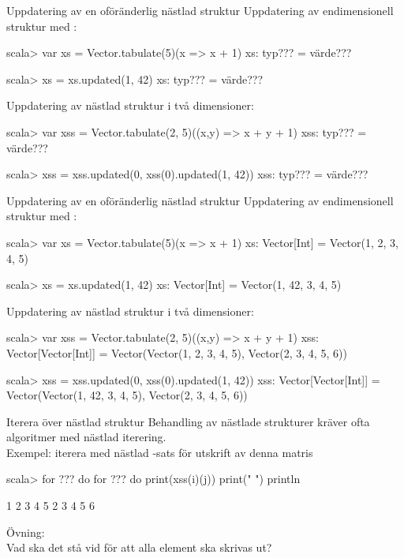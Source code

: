 \begin{Slide}{Uppdatering av en oföränderlig nästlad struktur}\SlideFontSmall
Uppdatering av endimensionell struktur med :\\
{\SlideFontTiny{} }
\begin{REPL}
scala> var xs = Vector.tabulate(5)(x => x + 1)
xs: typ??? = värde???

scala> xs = xs.updated(1, 42)
xs: typ??? = värde???
\end{REPL}

Uppdatering av nästlad struktur i två dimensioner:
\begin{REPL}
scala> var xss = Vector.tabulate(2, 5)((x,y) => x + y + 1)
xss:
  typ??? =
  värde???

scala> xss = xss.updated(0, xss(0).updated(1, 42))
xss:
  typ??? =
  värde???
\end{REPL}

\end{Slide}



\begin{Slide}{Uppdatering av en oföränderlig nästlad struktur}\SlideFontSmall
Uppdatering av endimensionell struktur med :\\
{\SlideFontTiny{} }
\begin{REPL}
scala> var xs = Vector.tabulate(5)(x => x + 1)
xs: Vector[Int] = Vector(1, 2, 3, 4, 5)

scala> xs = xs.updated(1, 42)
xs: Vector[Int] = Vector(1, 42, 3, 4, 5)
\end{REPL}

Uppdatering av nästlad struktur i två dimensioner:
\begin{REPL}
scala> var xss = Vector.tabulate(2, 5)((x,y) => x + y + 1)
xss: Vector[Vector[Int]] =
  Vector(Vector(1, 2, 3, 4, 5), Vector(2, 3, 4, 5, 6))

scala> xss = xss.updated(0, xss(0).updated(1, 42))
xss:
  Vector[Vector[Int]] =
  Vector(Vector(1, 42, 3, 4, 5), Vector(2, 3, 4, 5, 6))
\end{REPL}

\end{Slide}


\begin{Slide}{Iterera över nästlad struktur}\SlideFontSmall
Behandling av nästlade strukturer kräver ofta algoritmer med nästlad iterering. \\
Exempel: iterera med nästlad -sats för utskrift av denna matris\\
\pause
\begin{REPL}
scala> for ??? do
         for ??? do 
           print(xss(i)(j))
           print(" ")
         println

1 2 3 4 5
2 3 4 5 6
\end{REPL}
Övning: \\Vad ska det stå vid  för att alla element ska skrivas ut?
\end{Slide}

